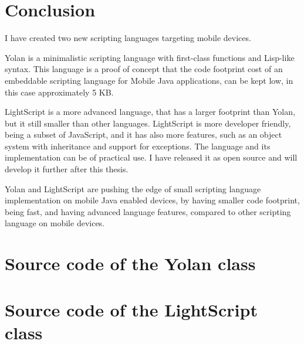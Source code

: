 \documentclass[11pt]{report}
\begin{document}
\chapter{Conclusion}
\label{conclusion}
I have created two new scripting languages targeting mobile devices.

Yolan is a minimalistic scripting language with first-class functions and Lisp-like syntax. This language is a proof of concept that the code footprint cost of an embeddable scripting language for Mobile Java applications, can be kept low, in this case approximately 5 KB.

LightScript is a more advanced language, that has a larger footprint than Yolan, but it still smaller than other languages. LightScript is more developer friendly, being a subset of JavaScript, and it has also more features, such as an object system with inheritance and support for exceptions.
The language and its implementation can be of practical use. I have released it as open source and will develop it further after this thesis.

Yolan and LightScript are pushing the edge of small scripting language implementation on mobile Java enabled devices, by having smaller code footprint, being fast, and having advanced language features, compared to other scripting language on mobile devices.


%
%

\newpage
{}



\appendix

%


\chapter{Source code of the Yolan class}


\chapter{Source code of the LightScript class}



\newpage
{}
\printindex
\end{document}
